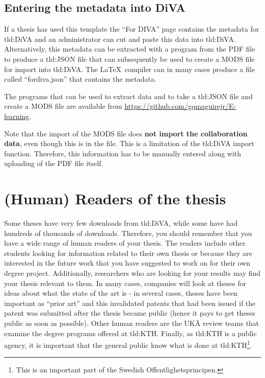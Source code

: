 \subsection{Entering the metadata into DiVA}
If a thesis has used this template the ``For DIVA'' page contains the metadata for \gls{tld:DiVA} and an administrator can cut and paste this data into \gls{tld:DiVA}. Alternatively, this metadata can be extracted with a program from the PDF file to produce a \gls{tld:JSON} file that can subsequently be used to create a MODS file for import into \gls{tld:DiVA}. The \LaTeX\ compiler can in many cases produce a file called ``fordiva.json'' that contains the metadata.

The programs that can be used to extract data and to take a \gls{tld:JSON} file and create a MODS file are available from \url{https://github.com/gqmaguirejr/E-learning}.

Note that the import of the MODS file does \textbf{not import the collaboration data}, even though this is in the file. This is a limitation of the \gls{tld:DiVA} import function. Therefore, this information has to be manually entered along with uploading of the PDF file itself.

\section{(Human) Readers of the thesis}
\label{sec:readers}
Some theses have very few downloads from \gls{tld:DiVA}, while some have had hundreds of thousands of downloads. Therefore, you should remember that you have a wide range of human readers of your thesis. The readers include other students looking for information related to their own thesis or because they are interested in the future work that you have suggested to work on for their own degree project. Additionally, researchers who are looking for your results may find your thesis relevant to them. In many cases, companies will look at theses for ideas about what the state of the art is - in several cases, theses have been important as ``prior art'' and this invalidated patents that had been issued if the patent was submitted after the thesis became public (hence it pays to get theses public as soon as possible). Other human readers are the \foreignlanguage{swedish}{UKÄ} review teams that examine the degree programs offered at \gls{tld:KTH}. Finally, as \gls{tld:KTH} is a public agency, it is important that the general public know what is done at \gls{tld:KTH}\footnote{This is an important part of the Swedish \foreignlanguage{swedish}{Offentlighetsprincipen}.}.

